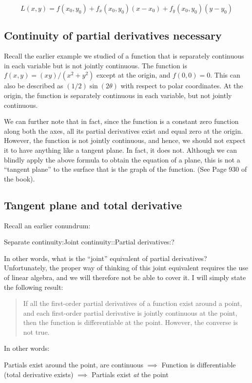 \documentclass[10pt]{amsart}
\begin{document}
$$L(x,y) =  f(x_0,y_0) + f_x(x_0,y_0)(x - x_0) + f_y(x_0,y_0)(y - y_0)$$

\subsection{Continuity of partial derivatives necessary}

Recall the earlier example we studied of a function that is separately
continuous in each variable but is not jointly continuous. The
function is $f(x,y) = (xy)/(x^2 + y^2)$ except at the origin, and
$f(0,0) = 0$. This can also be described as $(1/2)\sin(2\theta)$ with
respect to polar coordinates. At the origin, the function is
separately continuous in each variable, but not jointly continuous.

We can further note that in fact, since the function is a constant
zero function along both the axes, all its partial derivatives exist
and equal zero at the origin. However, the function is not jointly
continuous, and hence, we should not expect it to have anything like a
tangent plane. In fact, it does not. Although we can blindly apply the
above formula to obtain the equation of a plane, this is not a
``tangent plane'' to the surface that is the graph of the
function. (See Page 930 of the book).

\subsection{Tangent plane and total derivative}

Recall an earlier conundrum:

Separate continuity:Joint continuity::Partial derivatives:?

In other words, what is the ``joint'' equivalent of partial
derivatives? Unfortunately, the proper way of thinking of this joint
equivalent requires the use of linear algebra, and we will therefore
not be able to cover it. I will simply state the following result:

\begin{quote}
  If all the first-order partial derivatives of a function exist
  around a point, and each first-order partial derivative is jointly
  continuous at the point, then the function is differentiable at the
  point. However, the converse is not true.
\end{quote}

In other words:

Partials exist around the point, are continuous $\implies$ Function is
differentiable (total derivative exists) $\implies$ Partials exist
{\em at} the point
\end{document}
